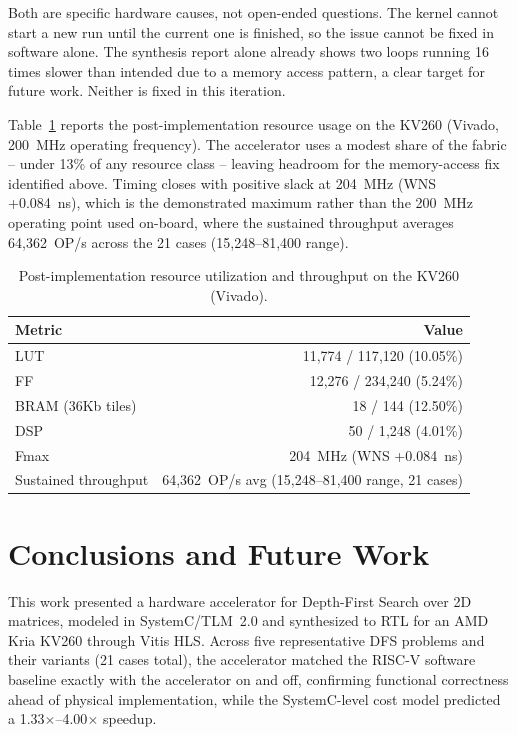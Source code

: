 \documentclass[conference]{IEEEtran}
\begin{document}
Both are specific hardware causes, not open-ended questions. The kernel
cannot start a new run until the current one is finished, so the issue
cannot be fixed in software alone. The synthesis report alone already
shows two loops running 16 times slower than intended due to a memory
access pattern, a clear target for future work. Neither is fixed in
this iteration.

Table~\ref{tab:resource_utilization} reports the post-implementation
resource usage on the KV260 (Vivado, 200~MHz operating frequency). The
accelerator uses a modest share of the fabric -- under 13\% of any
resource class -- leaving headroom for the memory-access fix identified
above. Timing closes with positive slack at 204~MHz (WNS +0.084~ns),
which is the demonstrated maximum rather than the 200~MHz operating
point used on-board, where the sustained throughput averages
64{,}362~OP/s across the 21 cases (15{,}248--81{,}400 range).

\begin{table}[h]
\centering
\footnotesize
\caption{Post-implementation resource utilization and throughput on the KV260 (Vivado).}
\label{tab:resource_utilization}
\renewcommand{\arraystretch}{1.15}
\begin{tabular}{@{}lr@{}}
\toprule
\textbf{Metric} & \textbf{Value} \\
\midrule
LUT & 11{,}774 / 117{,}120 (10.05\%) \\
FF & 12{,}276 / 234{,}240 (5.24\%) \\
BRAM (36Kb tiles) & 18 / 144 (12.50\%) \\
DSP & 50 / 1{,}248 (4.01\%) \\
Fmax & 204~MHz (WNS +0.084~ns) \\
Sustained throughput & 64{,}362~OP/s avg (15{,}248--81{,}400 range, 21 cases) \\
\bottomrule
\end{tabular}
\end{table}

\section{Conclusions and Future Work}

This work presented a hardware accelerator for Depth-First Search over 2D
matrices, modeled in SystemC/TLM~2.0 and synthesized to RTL for an AMD Kria
KV260 through Vitis HLS. Across five representative DFS problems and their
variants (21 cases total), the accelerator matched the RISC-V software
baseline exactly with the accelerator on and off, confirming functional
correctness ahead of physical implementation, while the SystemC-level cost
model predicted a 1.33$\times$--4.00$\times$ speedup.
\end{document}
